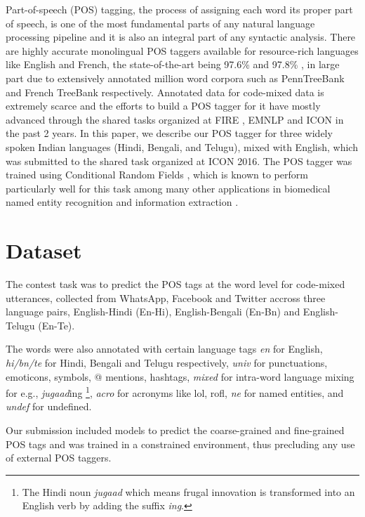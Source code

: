 \documentclass[11pt,a4paper]{article}
\begin{document}
Part-of-speech (POS) tagging, the process of assigning each word its proper part of speech, is one of the most fundamental parts of any natural language processing pipeline and it is also an integral part of any syntactic analysis. There are highly accurate monolingual POS taggers available for resource-rich languages like English and French, the state-of-the-art being 97.6\% \cite{Choi:16} and 97.8\% \cite{Denis:09}, in large part due to extensively annotated million word corpora such as PennTreeBank \cite{Santorini:90} and French TreeBank \cite{Abeille:03} respectively. Annotated data for code-mixed data is extremely scarce and the efforts to build a POS tagger for it have mostly advanced through the shared tasks organized at FIRE \cite{Choudhury:14}, EMNLP\cite{Barman:14,Solorio:14} and ICON\cite{Soman:15,Pimpale:16} in the past 2 years. In this paper, we describe our POS tagger for three widely spoken Indian languages (Hindi, Bengali, and Telugu), mixed with English, which was submitted to the shared task organized at ICON 2016. The POS tagger was trained using Conditional Random Fields \cite{Lafferty:01}, which is known to perform particularly well for this task \cite{Toutanova:03} among many other applications in biomedical named entity recognition \cite{Settles:04} and information extraction \cite{Ramesh:16}.
 
\section{Dataset}

The contest task was to predict the POS tags at the word level for code-mixed utterances, collected from WhatsApp, Facebook and Twitter accross three language pairs, English-Hindi (En-Hi), English-Bengali (En-Bn) and English-Telugu (En-Te).

The words were also annotated with certain language tags \textemdash{}  \textit{en} for English, \textit{hi/bn/te} for Hindi, Bengali and Telugu respectively, \textit{univ} for punctuations, emoticons, symbols, @ mentions, hashtags, \textit{mixed} for intra-word language mixing for e.g., \textit{jugaad}ing \footnote{The Hindi noun \textit{jugaad} which means frugal innovation is transformed into an English verb by adding the suffix \textit{ing}.}, \textit{acro} for acronyms like lol, rofl, \textit{ne} for named entities, and \textit{undef} for undefined.

Our submission included models to predict the coarse-grained \cite{Petrov:11} and fine-grained POS tags \cite{Jamatia:15} and was trained in a constrained environment, thus precluding any use of external POS taggers.
\end{document}
